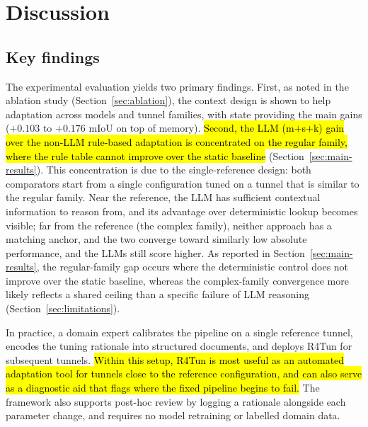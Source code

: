 \documentclass[a4paper,fleqn]{cas-dc}
\begin{document}
{%
\section{Discussion}\label{sec:discussion}

\subsection{Key findings}

The experimental evaluation yields two primary findings. First, as noted in the ablation study (Section~\ref{sec:ablation}), the context design is shown to help adaptation across models and tunnel families, with state providing the main gains ($+0.103$ to $+0.176$ mIoU on top of memory). \hl{Second, the LLM (m+s+k) gain over the non-LLM rule-based adaptation is concentrated on the regular family, where the rule table cannot improve over the static baseline} (Section~\ref{sec:main-results}). This concentration is due to the single-reference design: both comparators start from a single configuration tuned on a tunnel that is similar to the regular family. Near the reference, the LLM has sufficient contextual information to reason from, and its advantage over deterministic lookup becomes visible; far from the reference (the complex family), neither approach has a matching anchor, and the two converge toward similarly low absolute performance, and the LLMs still score higher. As reported in Section~\ref{sec:main-results}, the regular-family gap occurs where the deterministic control does not improve over the static baseline, whereas the complex-family convergence more likely reflects a shared ceiling than a specific failure of LLM reasoning (Section~\ref{sec:limitations}).


In practice, a domain expert calibrates the pipeline on a single reference tunnel, encodes the tuning rationale into structured documents, and deploys R4Tun for subsequent tunnels. \hl{Within this setup, R4Tun is most useful as an automated adaptation tool for tunnels close to the reference configuration, and can also serve as a diagnostic aid that flags where the fixed pipeline begins to fail.} The framework also supports post-hoc review by logging a rationale alongside each parameter change, and requires no model retraining or labelled domain data.

}
\end{document}
